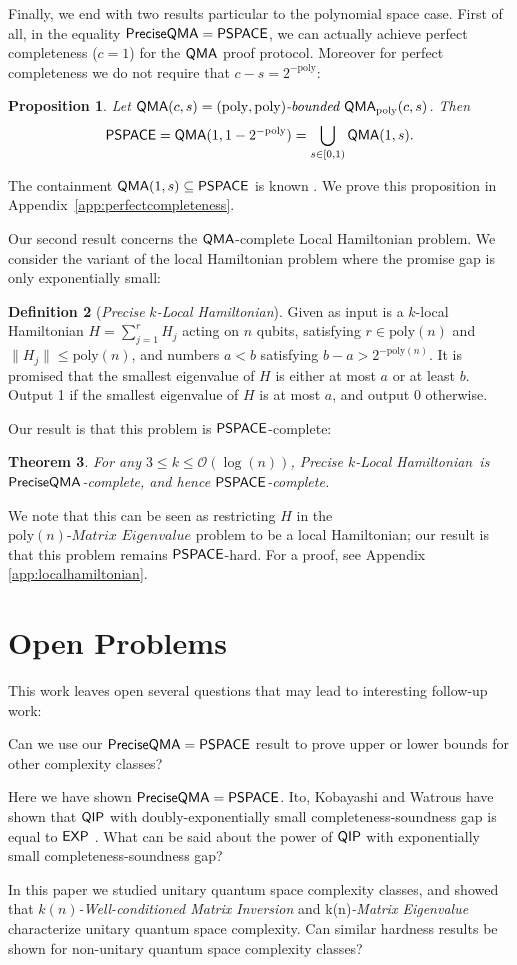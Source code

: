 \documentclass[11pt]{article}
\newtheorem{theorem}{Theorem}
\newtheorem{proposition}[theorem]{Proposition}
\theoremstyle{definition}
\newtheorem{definition}[theorem]{Definition}
\theoremstyle{remark}
\newcommand\EXP{{\sf{EXP}}}
\newcommand\QMA{{\sf{QMA}}}
\newcommand\QIP{{\sf{QIP}}}
\newcommand\PSPACE{{\sf{PSPACE}}}
\newcommand\QMAexp{{\sf{PreciseQMA}}}
\newcommand\bddQMA[5]{{\left(#1,#2\right)}\textit{-bounded }\QMA_{#3}(#4,#5)}
\newcommand\preciseklh{\textit{Precise }$k$\textit{-Local Hamiltonian}}
\newcommand\matrixinvert[1]{{\ensuremath{#1}}\textit{-Well-conditioned Matrix Inversion}}
\newcommand\spechamiltonian[1]{#1\textit{-Matrix Eigenvalue}}
\newcommand{\poly}{\textrm{poly}}
\begin{document}
Finally, we end with two results particular to the polynomial space case. First of all, in the equality $\QMAexp=\PSPACE$, we can actually achieve perfect completeness ($c=1$) for the $\QMA$ proof protocol. Moreover for perfect completeness we do not require that $c-s = 2^{-\poly}$:
\begin{proposition} \label{prop: perfect completeness} Let $\QMA(c,s) = \bddQMA{\poly}{\poly}{\poly}{c}{s}$. Then
\[
\PSPACE = \QMA(1,1-2^{-\poly}) = \bigcup_{s \in [0,1)}\QMA(1,s).
\]
\end{proposition}
The containment $\QMA(1,s) \subseteq \PSPACE$ is known \cite{ikw12}. We prove this proposition in Appendix~\ref{app:perfectcompleteness}.

Our second result concerns the $\QMA$-complete Local Hamiltonian problem. We consider the variant of the local Hamiltonian problem where the promise gap is only exponentially small: 
\begin{definition}[\preciseklh]
Given as input is a $k$-local Hamiltonian $H=\sum_{j=1}^rH_j$ acting on $n$ qubits, satisfying $r \in \poly(n)$ and $\|H_j\| \le \poly(n)$, and numbers $a < b$ satisfying $b - a > 2^{-\poly(n)}$. It is promised that the smallest eigenvalue of $H$ is either at most $a$ or at least $b$. Output 1 if the smallest eigenvalue of $H$ is at most $a$, and output 0 otherwise.
\end{definition}
Our result is that this problem is $\PSPACE$-complete:
\begin{theorem} \label{thm: precise local hamiltonian}
For any $3 \le k \le \mathcal{O}(\log(n))$, \preciseklh \ is $\QMAexp$-complete, and hence $\PSPACE$-complete.
\end{theorem}
We note that this can be seen as restricting $H$ in the $\spechamiltonian{\poly(n)}$ problem to be a local Hamiltonian; our result is that this problem remains $\PSPACE$-hard. For a proof, see Appendix \ref{app:localhamiltonian}.

\section{Open Problems}
This work leaves open several questions that may lead to interesting follow-up work:
\begin{compactenum}
\begin{item} Can we use our $\QMAexp=\PSPACE$ result to prove upper or lower bounds for other complexity classes? \end{item}
\begin{item} Here we have shown $\QMAexp=\PSPACE$.  Ito, Kobayashi and Watrous  have shown that $\QIP$ with doubly-exponentially small completeness-soundness gap is equal to $\EXP$ \cite{ikw12}.  What can be said about the power of $\QIP$ with exponentially small completeness-soundness gap?\end{item}
\begin{item}In this paper we studied unitary quantum space complexity classes, and showed that \matrixinvert{k(n)} and \spechamiltonian{k(n)} characterize unitary quantum space complexity.  Can similar hardness results be shown for non-unitary quantum space complexity classes?\end{item}
\end{compactenum}
\end{document}
